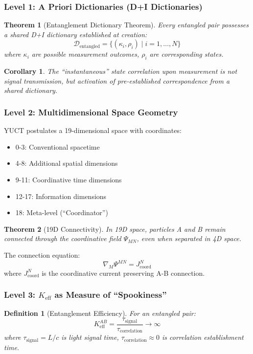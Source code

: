 \documentclass[11pt,a4paper]{article}
\newtheorem{theorem}{Theorem}
\newtheorem{definition}{Definition}
\newtheorem{corollary}{Corollary}
\begin{document}
	\subsubsection{Level 1: A Priori Dictionaries (D+I Dictionaries)}
	\begin{theorem}[Entanglement Dictionary Theorem]
		Every entangled pair possesses a shared D+I dictionary established at creation:
		\begin{equation}
			\mathcal{D}_{\text{entangled}} = \{(\kappa_i, \rho_i) \mid i = 1,\dots,N\}
		\end{equation}
		where $\kappa_i$ are possible measurement outcomes, $\rho_i$ are corresponding states.
	\end{theorem}
	
	\begin{corollary}
		The ``instantaneous'' state correlation upon measurement is not signal transmission, but activation of pre-established correspondence from a shared dictionary.
	\end{corollary}
	
	\subsubsection{Level 2: Multidimensional Space Geometry}
	YUCT postulates a 19-dimensional space with coordinates:
	\begin{itemize}
		\item 0-3: Conventional spacetime
		\item 4-8: Additional spatial dimensions
		\item 9-11: Coordinative time dimensions
		\item 12-17: Information dimensions
		\item 18: Meta-level (``Coordinator'')
	\end{itemize}
	
	\begin{theorem}[19D Connectivity]
		In 19D space, particles A and B remain connected through the coordinative field $\Psi_{MN}$, even when separated in 4D space.
	\end{theorem}
	
	The connection equation:
	\begin{equation}
		\nabla_M \Psi^{MN} = J^N_{\text{coord}}
	\end{equation}
	where $J^N_{\text{coord}}$ is the coordinative current preserving A-B connection.
	
	\subsubsection{Level 3: $K_{\mathrm{eff}}$ as Measure of ``Spookiness''}
	\begin{definition}[Entanglement Efficiency]
		For an entangled pair:
		\begin{equation}
			K_{\mathrm{eff}}^{AB} = \frac{\tau_{\text{signal}}}{\tau_{\text{correlation}}} \to \infty
		\end{equation}
		where $\tau_{\text{signal}} = L/c$ is light signal time, $\tau_{\text{correlation}} \approx 0$ is correlation establishment time.
	\end{definition}
	
\end{document}
